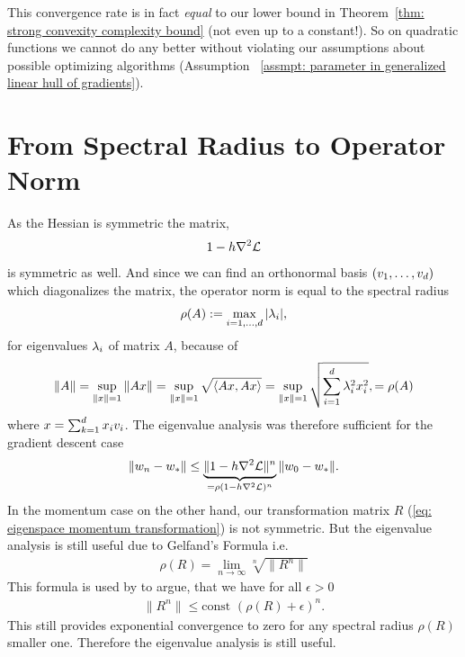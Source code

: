 This convergence rate is in fact \emph{equal} to our lower bound  in
Theorem~\ref{thm: strong convexity complexity bound} (not even up to a
constant!). So on quadratic functions we cannot do any better without violating
our assumptions about possible optimizing algorithms (Assumption~ \ref{assmpt:
parameter in generalized linear hull of gradients}).

\section{From Spectral Radius to Operator Norm}

As the Hessian is symmetric the matrix,
\begin{align*}
	1-h \nabla^2\mathcal{L}
\end{align*}
is symmetric as well. And since we can find an orthonormal basis \((v_1,\dots,
v_d)\) which diagonalizes the matrix, the operator norm is equal
to the spectral radius
\begin{align*}
	\rho(A)
	:= \max_{i=1,\dots,d} |\lambda_i|,
\end{align*}
for eigenvalues \(\lambda_i\) of matrix \(A\), because of
\begin{align*}
	\|A\| = \sup_{\|x\| =1} \|Ax\|
	= \sup_{\|x\| =1} \sqrt{\langle Ax, Ax\rangle}
	= \sup_{\|x\| =1} \sqrt{\sum_{i=1}^d \lambda_i^2 x_i^2},
	= \rho(A)
\end{align*}
where \(x=\sum_{k=1}^d x_i v_i\). The eigenvalue analysis was therefore
sufficient for the gradient descent case
\begin{align*}
	\|w_n-w_*\|
	\le \underbrace{\|1-h\nabla^2\mathcal{L} \|^n}_{
		=\rho(1-h\nabla^2\mathcal{L})^n
	} \|w_0 - w_*\|.
\end{align*}
In the momentum case on the other
hand, our transformation matrix \(R\) (\ref{eq: eigenspace momentum transformation})
is not symmetric. But the eigenvalue analysis is still useful due to Gelfand's Formula
\parencite{gelfandNormierteRinge1941} i.e.
\begin{align*}
	\rho(R) = \lim_{n\to\infty}\sqrt[n]{\|R^n\|}
\end{align*}
This formula is used by \textcite[p. 38, Lemma 1]{polyakIntroductionOptimization1987}
to argue, that we have for all \(\epsilon>0\)
\begin{align*}
	\|R^n\|\le \text{const } (\rho(R) + \epsilon)^n.
\end{align*}
This still provides exponential convergence to zero for any spectral radius
\(\rho(R)\) smaller one. Therefore the eigenvalue analysis is still useful.

